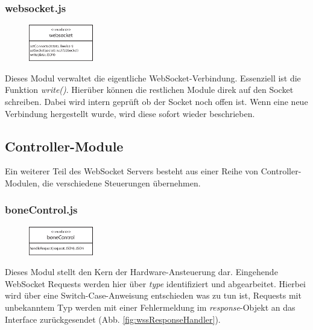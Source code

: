 \subsubsection{websocket.js}
\begin{figure}
  \vspace{-16pt}
  \centering
  \includegraphics[width = 0.25\textwidth]{documentation/images/apiWebsocket.eps}
\end{figure}

Dieses Modul verwaltet die eigentliche WebSocket-Verbindung. Essenziell ist die Funktion \textit{write()}. Hierüber können die restlichen Module direk auf den Socket schreiben. Dabei wird intern geprüft ob der Socket noch offen ist. Wenn eine neue Verbindung hergestellt wurde, wird diese sofort wieder beschrieben.


\subsection{Controller-Module}
Ein weiterer Teil des WebSocket Servers besteht aus einer Reihe von Controller-Modulen, die verschiedene Steuerungen übernehmen.

\subsubsection{boneControl.js}
\begin{figure}
  \vspace{-16pt}
  \centering
  \includegraphics[width = 0.25\textwidth]{documentation/images/apiBoneControl.eps}
\end{figure}

Dieses Modul stellt den Kern der Hardware-Ansteuerung dar. Eingehende WebSocket Requests werden hier über \textit{type} identifiziert und abgearbeitet. Hierbei wird über eine Switch-Case-Anweisung entschieden was zu tun ist, Requests mit unbekanntem Typ werden mit einer Fehlermeldung im \textit{response}-Objekt an das Interface zurückgesendet (Abb. \ref{fig:wssResponseHandler}).

